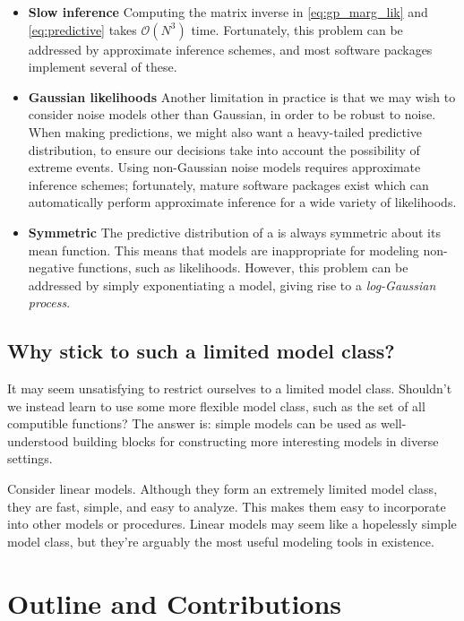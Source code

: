 \begin{itemize}
\item {\bf Slow inference}
Computing the matrix inverse in \eqref{eq:gp_marg_lik} and \eqref{eq:predictive} takes $\mathcal{O}(N^3)$ time.
Fortunately, this problem can be addressed by approximate inference schemes, and most \gp{} software packages implement several of these.
\item {\bf Gaussian likelihoods}
Another limitation in practice is that we may wish to consider noise models other than Gaussian, in order to be robust to noise.
When making predictions, we might also want a heavy-tailed predictive distribution, to ensure our decisions take into account the possibility of extreme events.
Using non-Gaussian noise models requires approximate inference schemes; fortunately, mature software packages exist which can automatically perform approximate inference for a wide variety of likelihoods.
\item {\bf Symmetric}
The predictive distribution of a \gp{} is always symmetric about its mean function.
This means that \gp{} models are inappropriate for modeling non-negative functions, such as likelihoods.
However, this problem can be addressed by simply exponentiating a \gp{} model, giving rise to a \emph{log-Gaussian process}.
\end{itemize}

\subsection{Why stick to such a limited model class?}
It may seem unsatisfying to restrict ourselves to a limited model class.
Shouldn't we instead learn to use some more flexible model class, such as the set of all computible functions?
The answer is: simple models can be used as well-understood building blocks for constructing more interesting models in diverse settings.

Consider linear models.
Although they form an extremely limited model class, they are fast, simple, and easy to analyze.
This makes them easy to incorporate into other models or procedures.
Linear models may seem like a hopelessly simple model class, but they're arguably the most useful modeling tools in existence.



\section{Outline and Contributions}

